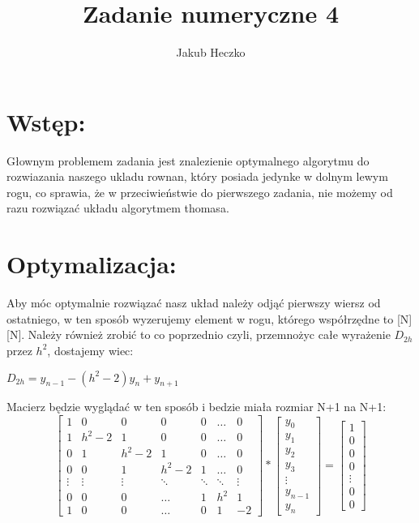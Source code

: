 \documentclass[12pt]{article}
\title{Zadanie numeryczne 4}
\author{Jakub Heczko}
\date{}
\begin{document}
\section{Wstęp:}
Głownym problemem zadania jest znalezienie optymalnego algorytmu do rozwiazania naszego ukladu rownan, który posiada jedynke w dolnym lewym rogu, co sprawia, że w przeciwieństwie do pierwszego zadania, nie możemy od razu rozwiązać układu algorytmem thomasa.
\section{Optymalizacja:}
Aby móc optymalnie rozwiązać nasz układ należy odjąć pierwszy wiersz od ostatniego, w ten sposób wyzerujemy element w rogu, którego współrzędne to [N][N]. Należy również zrobić to co poprzednio czyli, przemnożyc całe wyrażenie $D_{2h}$ przez $h^{2}$, dostajemy wiec:
\newline
\begin{center}
    $D_{2h} = y_{n-1} - (h^{2} - 2)y_{n} + y_{n+1}$
\end{center}
Macierz będzie wyglądać w ten sposób i bedzie miała rozmiar N+1 na N+1:
\[
\begin{bmatrix}
    1 & 0 & 0 & 0 & 0 & \dots & 0\\
    1 & h^{2}-2 & 1 & 0 & 0 & \dots & 0\\ 
    0 & 1 & h^{2}-2 & 1 & 0 & \dots & 0\\
    0 & 0 & 1 & h^{2}-2 & 1 &\dots & 0\\
    \vdots & \vdots & \vdots & \ddots & \ddots & \ddots & \vdots\\
    0 & 0 & 0 & \hdots & 1 & h^{2} & 1\\
    1 & 0 & 0 & \hdots & 0 & 1 & -2
\end{bmatrix}
*
\begin{bmatrix}
    y_{0}\\
    y_{1}\\
    y_{2}\\
    y_{3}\\
    \vdots\\
    y_{n-1}\\
    y_{n}
\end{bmatrix}
=
\begin{bmatrix}
    1\\
    0\\
    0\\
    0\\
    \vdots\\
    0\\
    0
\end{bmatrix}
\]
\end{document}
